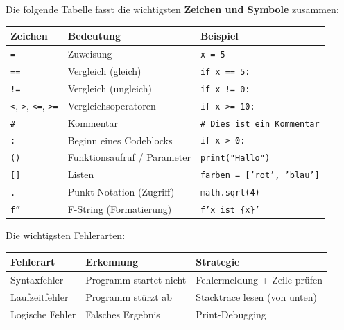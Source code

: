 \documentclass[ngerman,11pt]{article}
\begin{document}
\bigskip
Die folgende Tabelle fasst die wichtigsten \textbf{Zeichen und Symbole} zusammen:

\begin{center}
\begin{tabular}{|l|l|l|}
\hline
\textbf{Zeichen} & \textbf{Bedeutung} & \textbf{Beispiel} \\
\hline
\texttt{=} & Zuweisung & \texttt{x = 5} \\
\texttt{==} & Vergleich (gleich) & \texttt{if x == 5:} \\
\texttt{!=} & Vergleich (ungleich) & \texttt{if x != 0:} \\
\texttt{<}, \texttt{>}, \texttt{<=}, \texttt{>=} & Vergleichsoperatoren & \texttt{if x >= 10:} \\
\texttt{\#} & Kommentar & \texttt{\# Dies ist ein Kommentar} \\
\texttt{:} & Beginn eines Codeblocks & \texttt{if x > 0:} \\
\texttt{()} & Funktionsaufruf / Parameter & \texttt{print("Hallo")} \\
\texttt{[]} & Listen & \texttt{farben = ['rot', 'blau']} \\
\texttt{.} & Punkt-Notation (Zugriff) & \texttt{math.sqrt(4)} \\
\texttt{f''} & F-String (Formatierung) & \texttt{f'x ist \{x\}'} \\
\hline
\end{tabular}
\end{center}

\bigskip
Die wichtigsten Fehlerarten:

\begin{center}
\begin{tabular}{|l|l|l|}
\hline
\textbf{Fehlerart} & \textbf{Erkennung} & \textbf{Strategie} \\
\hline
Syntaxfehler & Programm startet nicht & Fehlermeldung + Zeile prüfen \\
\hline
Laufzeitfehler & Programm stürzt ab & Stacktrace lesen (von unten) \\
\hline
Logische Fehler & Falsches Ergebnis & Print-Debugging \\
\hline
\end{tabular}
\end{center}
\end{document}
